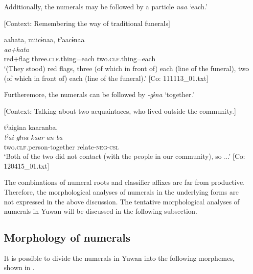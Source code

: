   \z
\z

  Additionally, the numerals may be followed by a particle \textit{naa} ‘each.’

\ea \label{ex:7:20}  [Context: Remembering the way of traditional funerals]

{\TM}
\glll  aahata,  miicɨnaa,  tˀaacɨnaa\\
\textit{aa+hata}  \textit{}  \textit{}\\
red+flag  three.\textsc{clf}.thing=each  two.\textsc{clf}.thing=each\\
\glt ‘(They stood) red flags, three (of which in front of) each (line of the funeral), two (of which in front of) each (line of the funeral).’ [Co: 111113\_01.txt]

\z

  Furtheremore, the numerals can be followed by \textit{{}-gɨna} ‘together.’

\ea \label{ex:7:21}  [Context: Talking about two acquaintaces, who lived outside the community.]

{\TM}
\glll  tˀaigɨna  kaaranba,\\
\textit{tˀai-gɨna}  \textit{kaar-an-ba}\\
two.\textsc{clf}.person-together  relate-\textsc{neg}-\textsc{csl}\\
\glt ‘Both of the two did not contact (with the people in our community), so ...’ [Co: 120415\_01.txt]

\z

The combinations of numeral roots and classifier affixes are far from productive. Therefore, the morphological analyses of numerals in the underlying forms are not expressed in the above discussion. The tentative morphological analyses of numerals in Yuwan will be discussed in the following subsection.

\subsection{Morphology of numerals}

It is possible to divide the numerals in Yuwan into the following morphemes, shown in .

